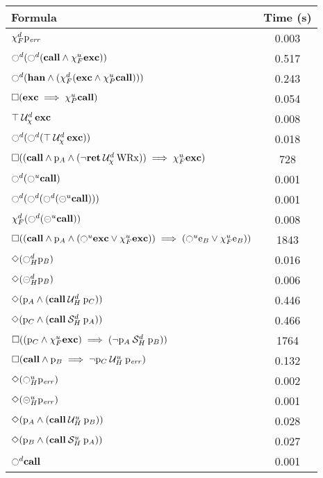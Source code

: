 \documentclass{article}
\begin{document}
\begin{table}
\centering
\begin{tabular}{| l | c |}
\hline
Formula & Time (s) \\
\hline
\hline
$\chi_F^{d} \mathrm{p}_\mathit{err}$ & 0.003 \\
$\ocircle^d (\ocircle^d (\mathbf{call} \land \chi_F^{u} \mathbf{exc}))$ & 0.517 \\
$\ocircle^d (\mathbf{han} \land (\chi_F^{d} (\mathbf{exc} \land \chi_P^{u} \mathbf{call})))$ & 0.243 \\
$\square (\mathbf{exc} \implies \chi_P^{u} \mathbf{call})$ & 0.054 \\
${\top} \mathbin{\mathcal{U}_\chi^d} {\mathbf{exc}}$ & 0.008 \\
$\ocircle^d (\ocircle^d ({\top} \mathbin{\mathcal{U}_\chi^d} {\mathbf{exc}}))$ & 0.018 \\
$\square ((\mathbf{call} \land \mathrm{p}_A \land ({\neg \mathbf{ret}} \mathbin{\mathcal{U}_\chi^d} {\mathrm{WRx}})) \implies \chi_F^{u} \mathbf{exc})$ & 728 \\
$\ocircle^d (\ocircle^u \mathbf{call})$ & 0.001 \\
$\ocircle^d (\ocircle^d (\ocircle^d (\circleddash^u \mathbf{call})))$ & 0.001 \\
$\chi_F^{d} (\ocircle^d (\circleddash^u \mathbf{call}))$ & 0.008 \\
$\square ((\mathbf{call} \land \mathrm{p}_A \land (\ocircle^u \mathbf{exc} \lor \chi_F^{u} \mathbf{exc})) \implies (\ocircle^u \mathrm{e}_B \lor \chi_F^{u} \mathrm{e}_B))$ &  1843 \\
$\Diamond (\ocircle_H^{d} \mathrm{p}_B)$ & 0.016 \\
$\Diamond (\circleddash_H^{d} \mathrm{p}_B)$ & 0.006 \\
$\Diamond (\mathrm{p}_A \land ({\mathbf{call}} \mathbin{\mathcal{U}_H^d} {\mathrm{p}_C}))$ & 0.446 \\
$\Diamond (\mathrm{p}_C \land ({\mathbf{call}} \mathbin{\mathcal{S}_H^d} {\mathrm{p}_A}))$ & 0.466 \\
$\square ((\mathrm{p}_C \land \chi_F^{u} \mathbf{exc}) \implies ({\neg \mathrm{p}_A} \mathbin{\mathcal{S}_H^d} {\mathrm{p}_B}))$ & 1764 \\
$\square (\mathbf{call} \land \mathrm{p}_B \implies {\neg \mathrm{p}_C} \mathbin{\mathcal{U}_H^u} {\mathrm{p}_\mathit{err}})$ & 0.132 \\
$\Diamond (\ocircle_H^{u} \mathrm{p}_\mathit{err})$ & 0.002 \\
$\Diamond (\circleddash_H^{u} \mathrm{p}_\mathit{err})$ & 0.001 \\
$\Diamond (\mathrm{p}_A \land ({\mathbf{call}} \mathbin{\mathcal{U}_H^u} {\mathrm{p}_B}))$ & 0.028 \\
$\Diamond (\mathrm{p}_B \land ({\mathbf{call}} \mathbin{\mathcal{S}_H^u} {\mathrm{p}_A}))$ & 0.027 \\
$\ocircle^d \mathbf{call}$ & 0.001 \\

\end{tabular}
\end{table}
\end{document}
